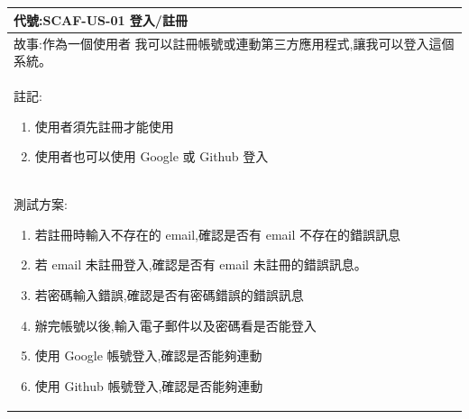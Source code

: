 \documentclass{report}
\begin{document}
\subsection*{}
\fontsize{12}{20}\selectfont
\begin{tabularx}{\textwidth}{|X|}
  \hline
  代號:SCAF-US-01 登入/註冊 \\ \hline
  故事:作為一個使用者
  我可以註冊帳號或連動第三方應用程式,讓我可以登入這個系統。 \\ \hline
  註記:
  \begin{enumerate}
    \item 使用者須先註冊才能使用
    \item 使用者也可以使用 Google 或 Github 登入
  \end{enumerate} \\ \hline
  測試方案:
  \begin{enumerate}
    \item 若註冊時輸入不存在的 email,確認是否有 email 不存在的錯誤訊息
    \item 若 email 未註冊登入,確認是否有 email 未註冊的錯誤訊息。
    \item 若密碼輸入錯誤,確認是否有密碼錯誤的錯誤訊息
    \item 辦完帳號以後,輸入電子郵件以及密碼看是否能登入
    \item 使用 Google 帳號登入,確認是否能夠連動
    \item 使用 Github 帳號登入,確認是否能夠連動
  \end{enumerate} \\ \hline
\end{tabularx}
\end{document}
